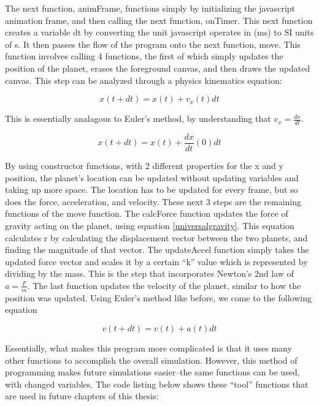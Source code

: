 The next function, animFrame, functions simply by initializing the javascript animation frame, and then calling the next function, onTimer.  This next function creates a variable dt by converting the unit javascript operates in (ms) to SI units of s.  It then passes the flow of the program onto the next function, move.  This function involves calling 4 functions, the first of which simply updates the position of the planet, erases the foreground canvas, and then draws the updated canvas.  This step can be analyzed through a physics kinematics equation:

\begin{equation}\label{velo}
x(t+dt) = x(t) + v_x(t)dt
\end{equation}

This is essentially analagous to Euler's method, by understanding that $v_x = \frac{dx}{dt}$.  

\begin{equation}\label{euler}
x(t+dt) = x(t) + \frac{dx}{dt}\left(0\right) dt
\end{equation}

By using constructor functions, with 2 different properties for the x and y position, the planet's location can be updated without updating variables and taking up more space.  The location has to be updated for every frame, but so does the force, acceleration, and velocity.  These next 3 steps are the remaining functions of the move function.  The calcForce function updates the force of gravity acting on the planet, using equation \ref{universalgravity}.  This equation calculates r by calculating the displacement vector between the two planets, and finding the magnitude of that vector.  The updateAccel function simply takes the updated force vector and scales it by a certain ``k'' value which is represented by dividing by the mass.  This is the step that incorporates Newton's 2nd law of $a = \frac{F}{m} $.  The last function updates the velocity of the planet, similar to how the position was updated.  Using Euler's method like before, we come to the following equation

\begin{equation}\label{euleraccel}
 v (t+dt) =  v(t) + a(t)dt 
\end{equation}





Essentially, what makes this program more complicated is that it uses many other functions to accomplish the overall simulation.  However, this method of programming makes future simulations easier--the same functions can be used, with changed variables.  The code listing below shows these ``tool'' functions that are used in future chapters of this thesis:

